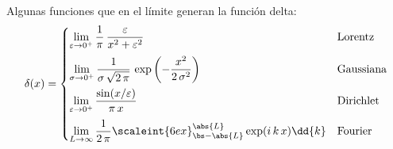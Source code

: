 Algunas funciones que en el límite generan la función delta:
\begin{align*}
\delta(x) = \begin{cases}
\displaystyle
\lim_{\varepsilon \to 0^{+}} \dfrac{1}{\pi} \, \dfrac{\varepsilon}{x^{2} + \varepsilon^{2}} & \mbox{Lorentz} \\[1em]
\displaystyle
\lim_{\sigma \to 0^{+}} \dfrac{1}{\sigma \, \sqrt{2 \, \pi}} \, \exp \left( - \dfrac{x^{2}}{2 \, \sigma^{2}} \right) & \mbox{Gaussiana} \\[1em]
\displaystyle \lim_{\varepsilon \to 0^{+}} \dfrac{\sin(x / \varepsilon)}{ \pi \, x} & \mbox{Dirichlet} \\[1em]
\displaystyle \lim_{L \to \infty} \dfrac{1}{2 \, \pi} \scaleint{6ex}_{\bs - \abs{L}}^{\abs{L}} \exp(i \, k \, x) \dd{k} & \mbox{Fourier}
\end{cases}
\end{align*}